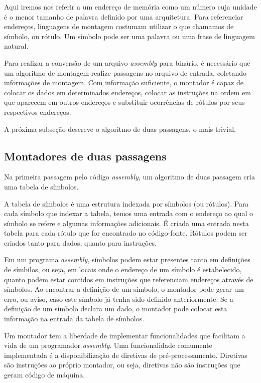Aqui iremos nos referir a um endereço de memória como um número cuja unidade é o
menor tamanho de palavra definido por uma arquitetura. Para referenciar
endereços, linguagens de montagem costumam utilizar o que chamamos de símbolo,
ou rótulo. Um símbolo pode ser uma palavra ou uma frase de linguagem natural.

Para realizar a conversão de um arquivo \textit{assembly} para binário, é
necessário que um algoritmo de montagem realize passagens no arquivo de entrada,
coletando informações de montagem. Com informação suficiente, o montador é capaz
de colocar os dados em determinados endereços, colocar as instruções na ordem em
que aparecem em outros endereços e substituir ocorrências de rótulos por seus
respectivos endereços.

A próxima subseção descreve o algoritmo de duas passagens, o mais trivial.

\subsection{Montadores de duas passagens}

Na primeira passagem pelo código \textit{assembly}, um algoritmo de duas
passagem cria uma tabela de símbolos.

A tabela de símbolos é uma estrutura indexada por símbolos (ou rótulos). Para
cada símbolo que indexar a tabela, temos uma entrada com o endereço ao qual o
símbolo se refere e algumas informações adicionais. É criada uma entrada nesta
tabela para cada rótulo que for encontrado no código-fonte. Rótulos podem ser
criados tanto para dados, quanto para instruções.

Em um programa \textit{assembly}, símbolos podem estar presentes tanto em
definições de símbilos, ou seja, em locais onde o endereço de um símbolo é
estabelecido, quanto podem estar contidos em instruções que referenciam
endereços através de símbolos. Ao encontrar a definição de um símbolo, o
montador pode gerar um erro, ou aviso, caso este símbolo já tenha sido definido
anteriormente. Se a definição de um símbolo declara um dado, o montador pode
colocar esta informação na entrada da tabela de símbolos.

Um montador tem a liberdade de implementar funcionalidades que facilitam a vida
de um programador \textit{assembly}. Uma funcionalidade comumente implementada é
a disponibilização de diretivas de pré-processamento. Diretivas são instruções
ao próprio montador, ou seja, diretivas não são instruções que geram código de
máquina.


